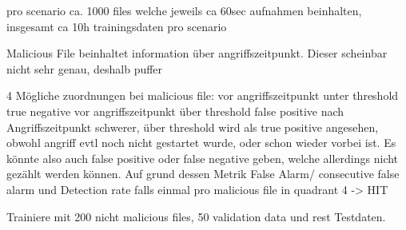         pro scenario ca. 1000 files welche jeweils ca 60sec aufnahmen beinhalten, insgesamt ca 10h trainingsdaten pro scenario

        Malicious File beinhaltet information über angriffszeitpunkt. Dieser scheinbar nicht sehr genau, deshalb puffer
        
        4 Mögliche zuordnungen bei malicious file: vor angriffszeitpunkt unter threshold true negative
        vor angriffszeitpunkt über threshold false positive nach Angriffszeitpunkt schwerer,
        über threshold wird als true positive angesehen, obwohl angriff evtl noch nicht gestartet wurde, oder schon wieder vorbei ist.
        Es könnte also auch false positive oder false negative geben, welche allerdings nicht gezählt werden können.
        Auf grund dessen Metrik False Alarm/ consecutive false alarm und Detection rate falls einmal pro malicious file in quadrant 4 -> HIT

        Trainiere mit 200 nicht malicious files, 50 validation data und rest Testdaten.
